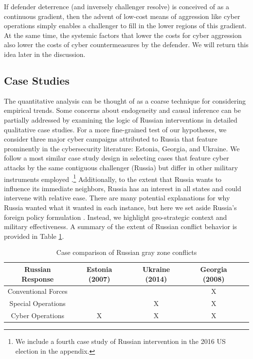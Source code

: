 \documentclass[bibtex, autowc]{apsr_submission}
\begin{document}
If defender deterrence (and inversely challenger resolve) is conceived of as a continuous gradient, then the advent of low-cost means of aggression like cyber operations simply enables a challenger to fill in the lower regions of this gradient. At the same time, the systemic factors that lower the costs for cyber aggression also lower the costs of cyber countermeasures by the defender. We will return this idea later in the discussion.

\subsection{Case Studies}
The quantitative analysis can be thought of as a coarse technique for considering empirical trends. Some concerns about endogeneity and causal inference can be partially addressed by examining the logic of Russian interventions in detailed qualitative case studies. 
For a more fine-grained test of our hypotheses, we consider three major cyber campaigns attributed to Russia that feature prominently in the cybersecurity literature: Estonia, Georgia, and Ukraine. We follow a most similar case study design in selecting cases that feature cyber attacks by the same contiguous challenger (Russia) but differ in other military instruments employed \citep{bennett_casestudymethods_2007}.\footnote{We include a fourth case study of Russian intervention in the 2016 US election in the appendix.} Additionally, to the extent that Russia wants to influence its immediate neighbors, Russia has an interest in all states and could intervene with relative ease. There are many potential explanations for why Russia wanted what it wanted in each instance, but here we set aside Russia's foreign policy formulation \citep{gotz_putinstatewar_2017, mcfaul_putinputinismdomestic_2020}. Instead, we highlight geo-strategic context and military effectiveness. A summary of the extent of Russian conflict behavior is provided in Table \ref{table:russia}.
    
	\begin{table}[h]
		\centering
		\begin{tabular}{|c|c|c|c|c|}
		    \hline
            \textbf{Russian Response} &  Estonia (2007) & Ukraine (2014) & Georgia (2008) \\
			\hline
            Conventional Forces  &  &  &  X  \\
			\hline
            Special Operations  &  & X & X \\
			\hline
			Cyber Operations & X & X & X \\
			\hline
	    \end{tabular}
        \caption{Case comparison of Russian gray zone conflicts}
		\label{table:russia}
	\end{table}
\end{document}
